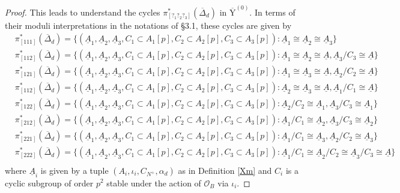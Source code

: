 \documentclass[10pt]{amsart}
\numberwithin{equation}{section}
\theoremstyle{plain}
\numberwithin{equation}{section}
\theoremstyle{definition}
\theoremstyle{remark}
\def\calO{\mathcal{O}}
\def\rmY{\mathrm{Y}}
\def\rmYbar{\overline{\rmY}}
\begin{document}
\begin{proof}
This leads to understand the cycles $\pi^{\ast}_{[?_{1}?_{2}?_{3}]}(\overline{\Delta}_{d})$ in $\rmYbar^{(0)}$. In terms of their moduli interpretations in the notations of \S 3.1, these cycles are given by
\begin{equation*}
\begin{aligned}
&\pi^{\ast}_{[111]}(\overline{\Delta}_{d})=\{(\underline{A}_{1}, \underline{A}_{2}, \underline{A}_{3}, C_{1}\subset A_{1}[p], C_{2}\subset A_{2}[p], C_{3}\subset A_{3}[p]): \underline{A}_{1}\cong\underline{A}_{2}\cong\underline{A}_{3}\}\\
&\pi^{\ast}_{[112]}(\overline{\Delta}_{d})=\{(\underline{A}_{1}, \underline{A}_{2}, \underline{A}_{3}, C_{1}\subset A_{1}[p], C_{2}\subset A_{2}[p], C_{3}\subset A_{3}[p]): \underline{A}_{1}\cong \underline{A}_{2}\cong\underline{A}, \underline{A}_{3}/C_{3}\cong\underline{A}\}\\
&\pi^{\ast}_{[121]}(\overline{\Delta}_{d})=\{(\underline{A}_{1}, \underline{A}_{2}, \underline{A}_{3}, C_{1}\subset A_{1}[p], C_{2}\subset A_{2}[p], C_{3}\subset A_{3}[p]): \underline{A}_{1}\cong \underline{A}_{3}\cong\underline{A}, \underline{A}_{2}/C_{2}\cong\underline{A}\}\\
&\pi^{\ast}_{[112]}(\overline{\Delta}_{d})=\{(\underline{A}_{1}, \underline{A}_{2}, \underline{A}_{3}, C_{1}\subset A_{1}[p], C_{2}\subset A_{2}[p], C_{3}\subset A_{3}[p]): \underline{A}_{2}\cong \underline{A}_{3}\cong\underline{A}, \underline{A}_{1}/C_{1}\cong\underline{A}\}\\
&\pi^{\ast}_{[122]}(\overline{\Delta}_{d})=\{(\underline{A}_{1}, \underline{A}_{2}, \underline{A}_{3}, C_{1}\subset A_{1}[p], C_{2}\subset A_{2}[p], C_{3}\subset A_{3}[p]): \underline{A}_{2}/C_{2}\cong \underline{A}_{1}, \underline{A}_{3}/C_{3}\cong\underline{A}_{1}\}\\
&\pi^{\ast}_{[212]}(\overline{\Delta}_{d})=\{(\underline{A}_{1}, \underline{A}_{2}, \underline{A}_{3}, C_{1}\subset A_{1}[p], C_{2}\subset A_{2}[p], C_{3}\subset A_{3}[p]): \underline{A}_{1}/C_{1}\cong \underline{A}_{2}, \underline{A}_{3}/C_{3}\cong\underline{A}_{2}\}\\
&\pi^{\ast}_{[221]}(\overline{\Delta}_{d})=\{(\underline{A}_{1}, \underline{A}_{2}, \underline{A}_{3}, C_{1}\subset A_{1}[p], C_{2}\subset A_{2}[p], C_{3}\subset A_{3}[p]): \underline{A}_{1}/C_{1}\cong \underline{A}_{3}, \underline{A}_{2}/C_{2}\cong\underline{A}_{3}\}\\
&\pi^{\ast}_{[222]}(\overline{\Delta}_{d})=\{(\underline{A}_{1}, \underline{A}_{2}, \underline{A}_{3}, C_{1}\subset A_{1}[p], C_{2}\subset A_{2}[p], C_{3}\subset A_{3}[p]): \underline{A}_{1}/C_{1}\cong \underline{A}_{2}/C_{2}\cong\underline{A}_{3}/C_{3}\cong \underline{A}\}\\
\end{aligned}
\end{equation*}
where $\underline{A}_{i}$ is given by a tuple $(A_{i},  \iota_{i},  C_{N^{+}}, \alpha_{d})$ as in Definition \ref{Xm} and $C_{i}$ is a cyclic subgroup of order $p^{2}$ stable under the action of $\calO_{B}$ via $\iota_{i}$.


\end{proof}
\end{document}

